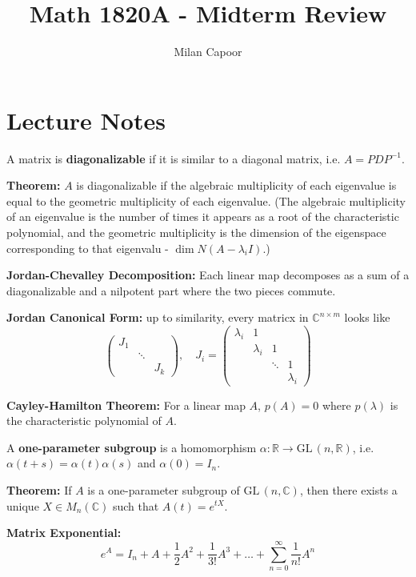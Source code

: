 \documentclass[12pt]{article}
\title{Math 1820A - Midterm Review}
\author{Milan Capoor}
\date{}
\newcommand{\R}{\mathbb{R}}
\newcommand{\C}{\mathbb{C}}
\newcommand{\GL}{\text{GL}\,}
\begin{document}
\maketitle

\section{Lecture Notes} 

A matrix is \textbf{diagonalizable} if it is similar to a diagonal matrix, i.e. $A = PDP^{-1}$. 

\textbf{Theorem:} $A$ is diagonalizable if the algebraic multiplicity of each eigenvalue is equal to the geometric multiplicity of each eigenvalue. (The algebraic multiplicity of an eigenvalue is the number of times it appears as a root of the characteristic polynomial, and the geometric multiplicity is the dimension of the eigenspace corresponding to that eigenvalu - $\dim N(A - \lambda_i I)$.)

\textbf{Jordan-Chevalley Decomposition:} Each linear map decomposes as a sum of a diagonalizable and a nilpotent part where the two pieces commute. 

\textbf{Jordan Canonical Form:} up to similarity, every matricx in $\C^{n\times m}$ looks like 
\[\begin{pmatrix}
    J_1\\ 
    & \ddots\\
    && J_k
\end{pmatrix}, \quad J_i = \begin{pmatrix}
    \lambda_i & 1\\
    & \lambda_i & 1\\
    && \ddots & 1\\
    &&& \lambda_i
\end{pmatrix}\]

\textbf{Cayley-Hamilton Theorem:} For a linear map $A$, $p(A) = 0$ where $p(\lambda)$ is the characteristic polynomial of $A$.

A \textbf{one-parameter subgroup} is a homomorphism $\alpha: \R \to \GL(n, \R)$, i.e. $\alpha(t+s) = \alpha(t)\alpha(s)$ and $\alpha(0) = I_n$.

\textbf{Theorem:} If $A$ is a one-parameter subgroup of  $\GL(n, \C)$, then there exists a unique $X \in M_n(\C)$ such that $A(t) = e^{tX}$.

\textbf{Matrix Exponential:}
\[e^A = I_n + A + \frac{1}{2}A^2 + \frac{1}{3!}A^3 + \dots + \sum_{n=0}^{\infty} \frac{1}{n!}A^n\]
\end{document}
